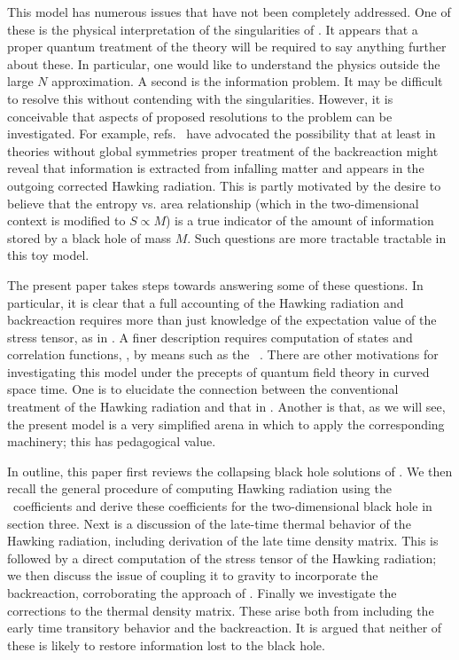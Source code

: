 This model has numerous issues that have not been completely addressed.
One of these is the physical interpretation of the singularities of
.  It appears that a proper quantum treatment of the
theory will be required to say anything further about these.  In
particular,
one would like
to understand the physics outside the
large $N$ approximation.
A second is
the information problem.  It may be difficult to resolve this without
contending with the singularities.  However, it is conceivable that
aspects of proposed resolutions to the problem can be investigated.  For
example, refs.~
have advocated the possibility that at least in
theories without global symmetries proper treatment of the backreaction
might reveal that information is extracted from infalling matter and
appears in the outgoing corrected Hawking radiation.  This is partly
motivated by the desire to believe that the entropy vs. area relationship
(which in the two-dimensional context is modified to $S\propto M$) is a
true indicator of the amount of information stored by a black hole of mass
$M$.  Such
questions are more tractable tractable in this toy model.

The present paper takes steps towards answering some of
these questions.  In particular, it is clear that a full accounting of the
Hawking radiation and backreaction requires more than just knowledge of the
expectation value of the stress tensor, as in .  A finer
description requires computation of states and
correlation functions, \etc, by means such as the \Bog\ \Xm.  There are
other motivations for investigating this model under the precepts of
quantum field theory in curved space time.  One is to elucidate the
connection between the conventional treatment of the Hawking radiation and
that in .
Another is that, as we will see, the present model is a very simplified
arena in which to apply the corresponding machinery; this has pedagogical
value.

In outline, this paper first reviews the collapsing black hole solutions of
.  We then recall the general procedure of computing
Hawking radiation using the \Bog\ coefficients and derive
these coefficients
for the two-dimensional black hole in section three.  Next is
a discussion of the late-time thermal behavior of the Hawking radiation,
including derivation of the late time density matrix.  This is followed by
a direct computation of the stress tensor of the Hawking radiation;  we
then discuss the issue of coupling it to gravity to incorporate the
backreaction, corroborating
the approach of
\CGHS.
Finally we investigate the corrections to the thermal density matrix. These
arise both from including the early time transitory behavior and the
backreaction.  It is argued that neither of these is likely to restore
information lost to the black hole.


